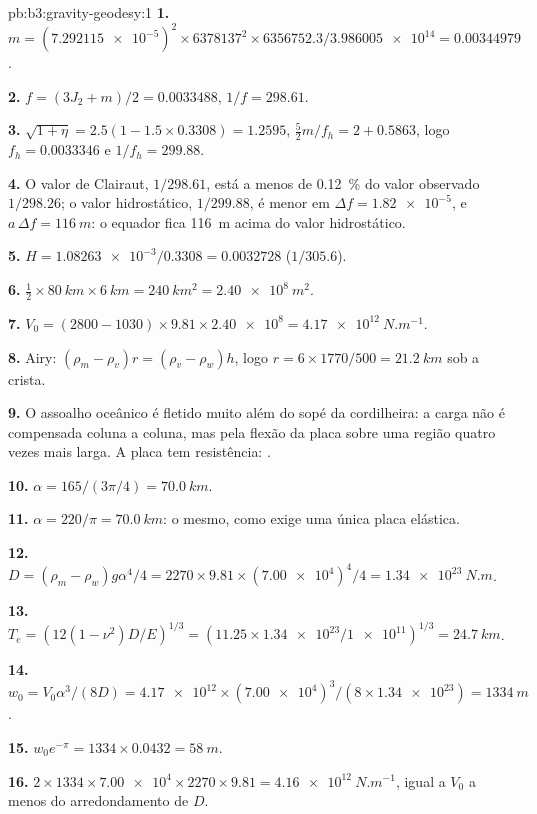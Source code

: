 \begin{solution}{pb:b3:gravity-geodesy:1}
\textbf{1.} $m = (\num{7.292115e-5})^2\times6378137^2\times6356752.3/
\num{3.986005e14} = \num{0.00344979}$.

\textbf{2.} $f = (3J_2 + m)/2 = \num{0.0033488}$, $1/f = 298.61$.

\textbf{3.} $\sqrt{1 + \eta} = 2.5(1 - 1.5\times0.3308) = 1.2595$,
$\tfrac52m/f_h = 2 + 0.5863$, logo $f_h = \num{0.0033346}$ e $1/f_h = 299.88$.

\textbf{4.} O valor de Clairaut, $1/298.61$, está a menos de \qty{0.12}{\percent}
do valor observado $1/298.26$; o valor hidrostático, $1/299.88$, é menor em
$\Delta f = \num{1.82e-5}$, e $a\,\Delta f = \qty{116}{m}$: o equador fica
\qty{116}{m} acima do valor hidrostático.

\textbf{5.} $H = \num{1.08263e-3}/0.3308 = \num{0.0032728}$ ($1/305.6$).

\textbf{6.} $\tfrac12\times\qty{80}{km}\times\qty{6}{km} = \qty{240}{km^2} =
\qty{2.40e8}{m^2}$.

\textbf{7.} $V_0 = (2800 - 1030)\times9.81\times\num{2.40e8} =
\qty{4.17e12}{N.m^{-1}}$.

\textbf{8.} Airy: $(\rho_m - \rho_v)r = (\rho_v - \rho_w)h$, logo $r =
6\times1770/500 = \qty{21.2}{km}$ sob a crista.

\textbf{9.} O assoalho oceânico é fletido muito além do sopé da cordilheira: a
carga não é compensada coluna a coluna, mas pela flexão da placa sobre uma
região quatro vezes mais larga. A placa tem resistência: .

\textbf{10.} $\alpha = 165/(3\pi/4) = \qty{70.0}{km}$.

\textbf{11.} $\alpha = 220/\pi = \qty{70.0}{km}$: o mesmo, como exige uma
única placa elástica.

\textbf{12.} $D = (\rho_m - \rho_w)g\alpha^4/4 = 2270\times9.81\times(\num{7.00e4})^4/4
= \qty{1.34e23}{N.m}$.

\textbf{13.} $T_e = (12(1 - \nu^2)D/E)^{1/3} = (11.25\times\num{1.34e23}/
\num{1e11})^{1/3} = \qty{24.7}{km}$.

\textbf{14.} $w_0 = V_0\alpha^3/(8D) = \num{4.17e12}\times(\num{7.00e4})^3/
(8\times\num{1.34e23}) = \qty{1334}{m}$.

\textbf{15.} $w_0e^{-\pi} = 1334\times0.0432 = \qty{58}{m}$.

\textbf{16.} $2\times1334\times\num{7.00e4}\times2270\times9.81 =
\qty{4.16e12}{N.m^{-1}}$, igual a $V_0$ a menos do arredondamento de $D$.


\end{solution}
